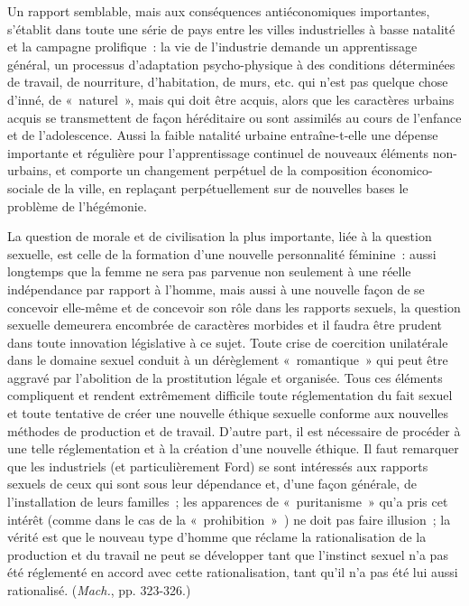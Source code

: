 \documentclass[french,twoside]{book} %
\begin{document}
Un rapport semblable, mais aux conséquences antiéconomiques importantes, s’établit dans toute une série de pays entre les villes industrielles à basse natalité et la campagne prolifique : la vie de l’industrie demande un apprentissage général, un processus d’adaptation psycho-physique à des conditions déterminées de travail, de nourriture, d’habitation, de murs, etc. qui n’est pas quelque chose d’inné, de « naturel », mais qui doit être acquis, alors que les caractères urbains acquis se transmettent de façon héréditaire ou sont assimilés au cours de l’enfance et de l’adolescence. Aussi la faible natalité urbaine entraîne-t-elle une dépense importante et régulière pour l’apprentissage continuel de nouveaux éléments non-urbains, et comporte un changement perpétuel de la composition économico-sociale de la ville, en replaçant perpétuellement sur de nouvelles bases le problème de l’hégémonie.\par
La question de morale et de civilisation la plus importante, liée à la question sexuelle, est celle de la formation d’une nouvelle personnalité féminine : aussi longtemps que la femme ne sera pas parvenue non seulement à une réelle indépendance par rapport à l’homme, mais aussi à une nouvelle façon de se concevoir elle-même et de concevoir son rôle dans les rapports sexuels, la question sexuelle demeurera encombrée de caractères morbides et il faudra être prudent dans toute innovation législative à ce sujet. Toute crise de coercition unilatérale dans le domaine sexuel conduit à un dérèglement « romantique » qui peut être aggravé par l’abolition de la prostitution légale et organisée. Tous ces éléments compliquent et rendent extrêmement difficile toute réglementation du fait sexuel et toute tentative de créer une nouvelle éthique sexuelle conforme aux nouvelles méthodes de production et de travail. D'autre part, il est nécessaire de procéder à une telle réglementation et à la création d’une nouvelle éthique. Il faut remarquer que les industriels (et particulièrement Ford) se sont intéressés aux rapports sexuels de ceux qui sont sous leur dépendance et, d’une façon générale, de l’installation de leurs familles ; les apparences de « puritanisme » qu’a pris cet intérêt (comme dans le cas de la « prohibition » ) ne doit pas faire illusion ; la vérité est que le nouveau type d’homme que réclame la rationalisation de la production et du travail ne peut se développer tant que l’instinct sexuel n’a pas été réglementé en accord avec cette rationalisation, tant qu’il n’a pas été lui aussi rationalisé. (\emph{Mach.}, pp. 323-326.)
\end{document}
